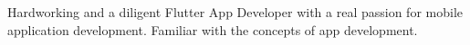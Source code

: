 

\begin{cvparagraph}


Hardworking and a diligent Flutter App Developer with a real passion for mobile application development. Familiar with the concepts of app development.

\end{cvparagraph}
